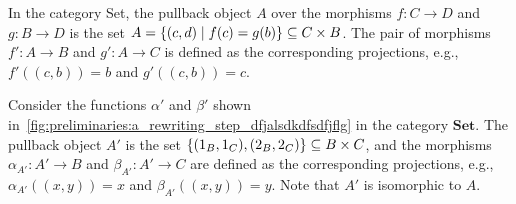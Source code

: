 \begin{example} 
    In the category Set, the pullback object $A$ over the morphisms $f : C \to D$ and $g : B \to D$ is the set $A = \{(c, d) \mid f (c) = g(b)\} \subseteq C \times B$. The pair of morphisms $f' \colon A \to B$ and $g' \colon A \to C$ is defined as the corresponding projections, e.g., $f'((c, b)) = b$ and $g'((c, b)) = c$.
    
    Consider the functions \(\alpha'\) and \(\beta'\) shown in~\autoref{fig:preliminaries:a_rewriting_step_dfjalsdkdfsdfjflg} in the category \(\mathbf{Set}\). 
  The pullback object $A'$ is the set $\{(1_B,1_C),(2_B,2_C)\} \subseteq B \times C$, and the morphisms $\alpha_{A'} \colon A' \to B$ and $\beta_{A'} \colon A' \to C$ are defined as the corresponding projections, e.g., $\alpha_{A'}((x,y)) = x$ and $\beta_{A'}((x,y)) = y$. Note that $A'$ is isomorphic to $A$.
      \begin{figure}[H]
      \centering 
\end{figure}
\end{example}
